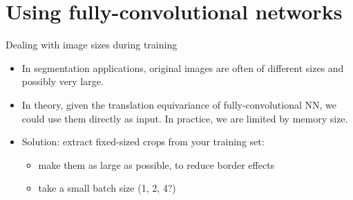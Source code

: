 \documentclass[xcolor=pdftex,dvipsnames,table,mathserif]{beamer}
\begin{document}







\section[Using CNNs]{Using fully-convolutional networks}

\begin{frame}{Dealing with image sizes during training}

  \begin{itemize}[<+->]
  \item   In segmentation applications, original images are often of different sizes and possibly very large.
  \item   In theory, given the translation equivariance of fully-convolutional NN, we could use them directly as input. In practice, we are limited by memory size.
  \item   Solution: extract fixed-sized crops from your training set:
    \begin{itemize}
    \item make them as large as possible, to reduce border effects
    \item take a small batch size (1, 2, 4?)
    \end{itemize}

  \end{itemize}

\end{frame}



\end{document}

